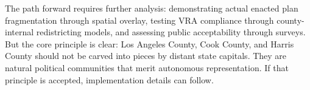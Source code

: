 The path forward requires further analysis: demonstrating actual enacted plan fragmentation through spatial overlay, testing VRA compliance through county-internal redistricting models, and assessing public acceptability through surveys. But the core principle is clear: Los Angeles County, Cook County, and Harris County should not be carved into pieces by distant state capitals. They are natural political communities that merit autonomous representation. If that principle is accepted, implementation details can follow.
